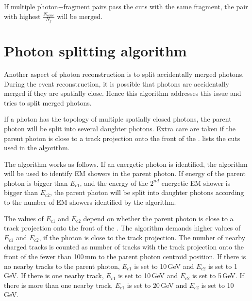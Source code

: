 If multiple photon$-$fragment pairs pass the cuts with the same fragment, the pair with highest $\frac{N_{cone}}{N_f}$ will be merged.



\section{Photon splitting algorithm}
\label{sec:photonSplitting}


Another aspect of photon reconstruction is to split accidentally merged photons. During the event reconstruction, it is possible that photons are accidentally merged if they are spatially close. Hence this algorithm  addresses this issue and tries to split merged photons.

If a photon has the  topology of multiple spatially closed photons, the parent photon will be split into several daughter photons. Extra care are taken if the parent photon is close to a track projection onto the front of the \ECAL.  lists the cuts used in the algorithm.

The algorithm works as follows. If an energetic photon is identified, the \peakFinding algorithm will  be used to identify EM showers in the parent photon. If energy of the parent photon is bigger than $E_{c1}$, and the energy of the $2^{nd}$ energetic EM shower is bigger than $E_{c2}$, the parent photon will be split into daughter photons according to the number of EM showers identified by the \peakFinding algorithm.

The values of $E_{c1}$ and $E_{c2}$ depend on whether the parent photon is close to a track projection onto the front of the \ECAL. The algorithm demands  higher values of $E_{c1}$ and   $E_{c2}$, if the photon is close to the track projection. The number of nearby charged tracks is counted as number of tracks with the track projection onto the front of the \ECAL fewer than 100\,mm to the parent photon centroid position. If there is no nearby tracks to the parent photon, $E_{c1}$ is set to 10\,GeV and $E_{c2}$ is set to 1\,GeV. If there is one nearby track, $E_{c1}$ is set to 10\,GeV and $E_{c2}$ is set to 5\,GeV. If there is more than one nearby track, $E_{c1}$ is set to 20\,GeV and $E_{c2}$ is set to 10\,GeV.


